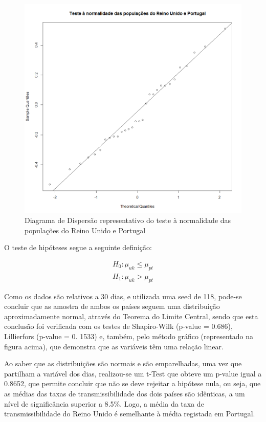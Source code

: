 \documentclass[conference]{IEEEtran}
\begin{document}
\begin{figure}[htbp]
\centerline{\includegraphics[width=0.95\columnwidth]{images/02.a.png}}
\caption{Diagrama de Dispersão representativo do teste à normalidade das populações do Reino Unido e Portugal}
\label{fig}
\end{figure}

O teste de hipóteses segue a seguinte definição:

\begin{equation}
  \begin{array}{l}
    H_{0}:\mu _{uk}\leq \mu _{pt} \\
   	H_{1}:\mu _{uk}> \mu _{pt}
  \end{array}
\end{equation}

Como os dados são relativos a 30 dias, e utilizada uma seed de 118, pode-se concluir que as amostra de ambos os países seguem uma distribuição aproximadamente normal, através do Teorema do Limite Central, sendo que esta conclusão foi verificada com os testes de Shapiro-Wilk (p-value = 0.686), Lillierfors (p-value = 0. 1533) e, também, pelo método gráfico (representado na figura acima), que demonstra que as variáveis têm uma relação linear. 

Ao saber que as distribuições são normais e são emparelhadas, uma vez que partilham a variável dos dias, realizou-se um t-Test que obteve um p-value igual a 0.8652, que permite concluir que não se deve rejeitar a hipótese nula, ou seja, que as médias das taxas de transmissibilidade dos dois países são idênticas, a um nível de significância superior a 8.5\%. Logo, a média da taxa de transmissibilidade do Reino Unido é semelhante à média registada em Portugal.
\end{document}
